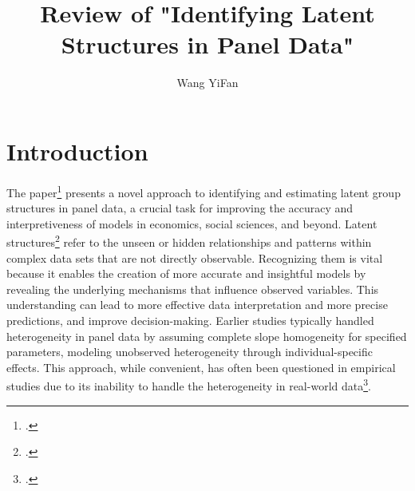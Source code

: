 \documentclass[UTF8,a4paper,10pt]{article}
\begin{document}
\title{Review of "Identifying Latent Structures in Panel Data"}
\author{Wang YiFan}





\section{Introduction}


The paper\footcite{Su2016} presents a novel approach to identifying and estimating latent group structures in panel data, a crucial task for improving the accuracy and interpretiveness of models in economics, social sciences, and beyond. 
Latent structures\Footcite{2023c} refer to the unseen or hidden relationships and patterns within complex data sets that are not directly observable. Recognizing them is vital because it enables the creation of more accurate and insightful models by revealing the underlying mechanisms that influence observed variables. This understanding can lead to more effective data interpretation and more precise predictions, and improve decision-making.
Earlier studies typically handled heterogeneity in panel data by assuming complete slope homogeneity for specified parameters, modeling unobserved heterogeneity through individual-specific effects. This approach, while convenient, has often been questioned in empirical studies due to its inability to handle the 
heterogeneity
  in real-world data\footcite[2216]{Su2016}.

\end{document}
